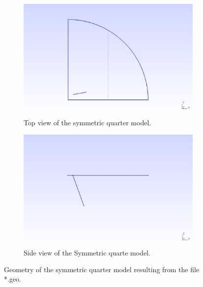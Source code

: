\documentclass[a4]{article}
\begin{document}
\begin{figure}[tbh!]
	\centering
	\begin{subfigure}[b]{0.48\textwidth}
		\centering
		\includegraphics[width=\textwidth]{geometry_quarter1.png}
		\caption{Top view of the symmetric quarter model.}
		\label{fig:geometry_quarter1}
	\end{subfigure}
	\begin{subfigure}[b]{0.48\textwidth}
		\centering
		\includegraphics[width=\textwidth]{geometry_quarter2.png}
		\caption{Side view of the Symmetric quarte model.}
		\label{fig:geometry_quarter2}
	\end{subfigure}
	\caption{Geometry of the symmetric quarter model resulting from the file *.geo.}
\label{fig:geometry_symmetric_2x2_group}
\end{figure}
\end{document}
